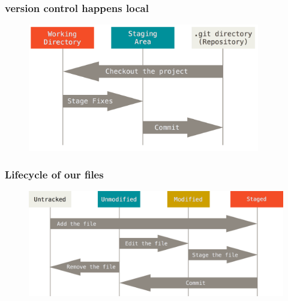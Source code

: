 \begin{frame}
    \frametitle{version control happens local}
    \begin{figure}[b]{\textwidth}
        \centering
        \includegraphics[width=0.9\textwidth]{../img/three_states.png}
    \end{figure}
\end{frame}

\begin{frame}
    \frametitle{Lifecycle of our files}
    \begin{figure}[b]{\textwidth}
        \centering
            \includegraphics[width=\textwidth]{../img/file_lifecycle.png}
    \end{figure}
\end{frame}


